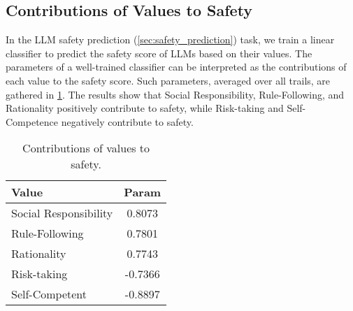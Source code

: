 \subsection{Contributions of Values to Safety}
\label{app:safety_prediction}
In the LLM safety prediction (\cref{sec:safety_prediction}) task, we train a linear classifier to predict the safety score of LLMs based on their values. The parameters of a well-trained classifier can be interpreted as the contributions of each value to the safety score. Such parameters, averaged over all trails, are gathered in \cref{tab:traits}. The results show that Social Responsibility, Rule-Following, and Rationality positively contribute to safety, while Risk-taking and Self-Competence negatively contribute to safety.


\begin{table}[h!]
    \centering
    \begin{tabular}{l | c}
    \toprule
    Value & Param \\
    \midrule
    Social Responsibility & 0.8073 \\
    Rule-Following        & 0.7801 \\
    Rationality           & 0.7743 \\
    Risk-taking           & -0.7366 \\
    Self-Competent        & -0.8897 \\
    \bottomrule
    \end{tabular}
    \caption{Contributions of values to safety.}
    \label{tab:traits}
\end{table}